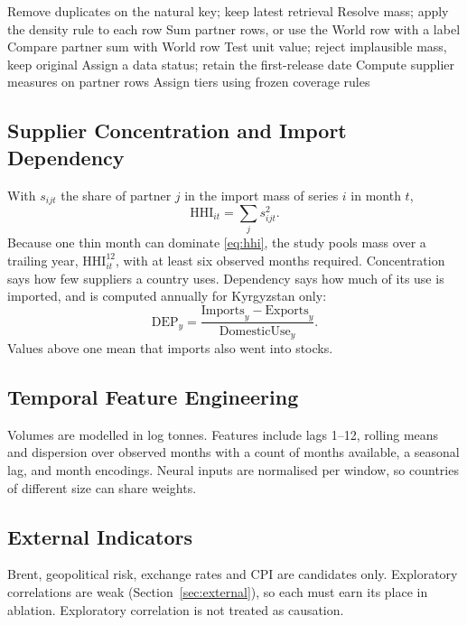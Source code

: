 \documentclass[conference]{IEEEtran}
\begin{document}
\begin{algorithm}[t]
\caption{Monthly series construction (conceptual)}
\label{alg:series}
\begin{algorithmic}[1]
  \State Remove duplicates on the natural key; keep latest retrieval
  \State Resolve mass; apply the density rule to each row
  \State Sum partner rows, or use the World row with a label
  \State Compare partner sum with World row
  \State Test unit value; reject implausible mass, keep original
  \State Assign a data status; retain the first-release date
\EndFor
\State Compute supplier measures on partner rows
\State Assign tiers using frozen coverage rules
\end{algorithmic}
\end{algorithm}

\subsection{Supplier Concentration and Import Dependency}
With $s_{ijt}$ the share of partner $j$ in the import mass of series $i$ in month $t$,
\begin{equation}
\mathrm{HHI}_{it}=\sum_{j} s_{ijt}^{2}.
\label{eq:hhi}
\end{equation}
Because one thin month can dominate \eqref{eq:hhi}, the study pools mass over a trailing year, $\mathrm{HHI}^{12}_{it}$, with at least six observed months required. Concentration says how few suppliers a country uses. Dependency says how much of its use is imported, and is computed annually for Kyrgyzstan only:
\begin{equation}
\mathrm{DEP}_{y}=\frac{\mathrm{Imports}_{y}-\mathrm{Exports}_{y}}{\mathrm{DomesticUse}_{y}}.
\label{eq:dep}
\end{equation}
Values above one mean that imports also went into stocks.

\subsection{Temporal Feature Engineering}
Volumes are modelled in log tonnes. Features include lags 1--12, rolling means and dispersion over observed months with a count of months available, a seasonal lag, and month encodings. Neural inputs are normalised per window, so countries of different size can share weights.

\subsection{External Indicators}
Brent, geopolitical risk, exchange rates and CPI are candidates only. Exploratory correlations are weak (Section~\ref{sec:external}), so each must earn its place in ablation. Exploratory correlation is not treated as causation.
\end{document}
